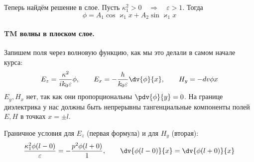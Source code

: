 Теперь найдём решение в слое. Пусть $\kappa_1^2>0  \quad\Rightarrow\quad  \varepsilon>1$. Тогда
\begin{equation}
    \phi = A_1 \cos \varkappa_1 x + A_2 \sin \varkappa_1 x
\end{equation}

\paragraph{TM волны в плоском слое.} Запишем поля через волновую функцию, как мы это делали в самом начале курса:
\begin{equation}
    E_z = \frac{\kappa^2}{ik_0 \varepsilon}\phi, \qquad
    E_x = -\frac{h}{k_0 \varepsilon} \dv{\phi}{x}, \qquad
    H_y = -dv{\phi}{x}
\end{equation}
$E_y, H_x$ нет, так как они пропорциональны $\pdv{\phi}{y}=0$.
На границе диэлектрика у нас должны быть непрерывны тангенциальные компоненты полей $E,H$ в точках $x=\pm l$.

Граничное условия для $E_z$ (первая формула) и для $H_y$ (вторая):
\begin{equation}
    \frac{\kappa_1^2 \phi(l-0)}{\varepsilon}=-\frac{p^2 \phi(l+0)}{1}, \qquad
    \dv{\phi(l-0)}{x} = \dv{\phi(l+0)}{x}
\end{equation}
